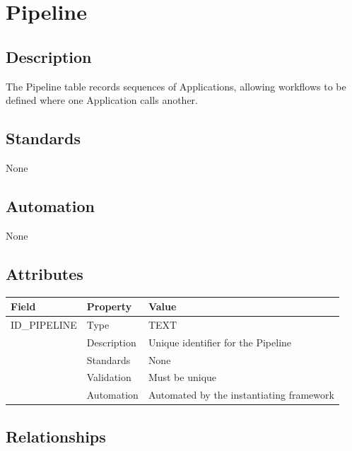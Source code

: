 \section{Pipeline}\label{pipeline}

\subsection{Description}\label{description-22}

The Pipeline table records sequences of Applications, allowing workflows
to be defined where one Application calls another.

\subsection{Standards}\label{standards-24}

None

\subsection{Automation}\label{automation-24}

None

\subsection{Attributes}\label{attributes-21}

\begin{longtable}[]{@{}lll@{}}
\toprule\noalign{}
Field & Property & Value \\
\midrule\noalign{}
\endhead
\bottomrule\noalign{}
\endlastfoot
ID\_PIPELINE & Type & TEXT \\
& Description & Unique identifier for the Pipeline \\
& Standards & None \\
& Validation & Must be unique \\
& Automation & Automated by the instantiating framework \\
\end{longtable}

\subsection{Relationships}\label{relationships-19}


